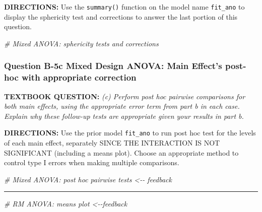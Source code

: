 \documentclass[
]{article}
\newenvironment{Shaded}{\begin{snugshade}}{\end{snugshade}}
\newcommand{\CommentTok}[1]{\textcolor[rgb]{0.56,0.35,0.01}{\textit{#1}}}
\begin{document}
\clearpage

\textbf{DIRECTIONS:} Use the \texttt{summary()} function on the model
name \texttt{fit\_ano} to display the sphericity test and corrections to
answer the last portion of this question.

\begin{Shaded}
\begin{Highlighting}[]
\CommentTok{\# Mixed ANOVA: sphericity tests and corrections}
\end{Highlighting}
\end{Shaded}

\clearpage

\hypertarget{question-b-5c-mixed-design-anova-main-effects-post-hoc-with-appropriate-correction}{%
\subsubsection{Question B-5c Mixed Design ANOVA: Main Effect's post-hoc
with appropriate
correction}\label{question-b-5c-mixed-design-anova-main-effects-post-hoc-with-appropriate-correction}}

\textbf{TEXTBOOK QUESTION:} \emph{(c) Perform post hoc pairwise
comparisons for both main effects, using the appropriate error term from
part b in each case. Explain why these follow-up tests are appropriate
given your results in part b.}

\textbf{DIRECTIONS:} Use the prior model \texttt{fit\_ano} to run post
hoc test for the levels of each main effect, separately SINCE THE
INTERACTION IS NOT SIGNIFICANT (including a means plot). Choose an
appropriate method to control type I errors when making multiple
comparisons.

\begin{Shaded}
\begin{Highlighting}[]
\CommentTok{\# Mixed ANOVA: post hoc pairwise tests \textless{}{-}{-} feedback}
\end{Highlighting}
\end{Shaded}

\begin{center}\rule{0.5\linewidth}{0.5pt}\end{center}

\begin{Shaded}
\begin{Highlighting}[]
\CommentTok{\# RM ANOVA: means plot \textless{}{-}{-}feedback}
\end{Highlighting}
\end{Shaded}
\end{document}
